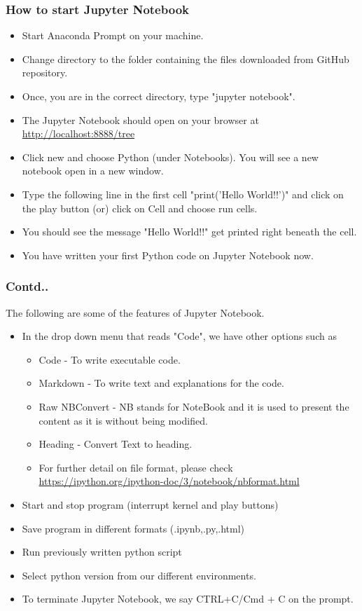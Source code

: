 \documentclass{beamer}
\begin{document}
\begin{frame}
\frametitle{How to start Jupyter Notebook}
\begin{itemize}[<+->]
\item Start Anaconda Prompt on your machine.
\item Change directory to the folder containing the files downloaded from GitHub repository.
\item Once, you are in the correct directory, type  "jupyter notebook".
\item The Jupyter Notebook should open on your browser at \url{http://localhost:8888/tree}
\item Click new and choose Python (under Notebooks). You will see a new notebook open in a new window.
\item Type the following line in the first cell "print('Hello World!!')" and click on the play button (or) click on Cell and choose run cells.
\item You should see the message "Hello World!!" get printed right beneath the cell.
\item You have written your first Python code on Jupyter Notebook now.
\end{itemize}
\end{frame}

\begin{frame}
\frametitle{Contd..}
The following are some of the features of Jupyter Notebook.
\begin{itemize}
\item In the drop down menu that reads "Code", we have other options such as 
\begin{itemize}
\item Code - To write executable code.
\item Markdown - To write text and explanations for the code.
\item Raw NBConvert - NB stands for NoteBook and it is used to present the content as it is without being modified.
\item Heading -  Convert Text to heading.
\item For further detail on file format, please check \url{https://ipython.org/ipython-doc/3/notebook/nbformat.html} 
\end{itemize}
\item Start and stop program (interrupt kernel and play buttons)
\item Save program in different formats (.ipynb,.py,.html)
\item Run previously written python script
\item Select python version from our different environments.
\item To terminate Jupyter Notebook, we say CTRL+C/Cmd + C on the prompt.
\end{itemize}
\end{frame}
%
%
\end{document}
